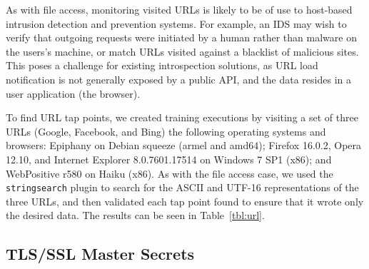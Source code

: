 As with file access, monitoring visited URLs is likely to be of use to
host-based intrusion detection and prevention systems. For example, an
IDS may wish to verify that outgoing requests were initiated by a human
rather than malware on the users's machine, or match URLs visited
against a blacklist of malicious sites. This poses a challenge for
existing introspection solutions, as URL load notification is not
generally exposed by a public API, and the data resides in a user
application (the browser).

To find URL tap points, we created training executions by visiting a set
of three URLs (Google, Facebook, and Bing) the following operating
systems and browsers: Epiphany on Debian squeeze (armel and amd64);
Firefox 16.0.2, Opera 12.10, and Internet Explorer 8.0.7601.17514 on
Windows 7 SP1 (x86); and WebPositive r580 on Haiku (x86). As with the
file access case, we used the \texttt{stringsearch} plugin to search for
the ASCII and UTF-16 representations of the three URLs, and then
validated each tap point found to ensure that it wrote only the desired
data. The results can be seen in Table~\ref{tbl:url}.

\subsection{TLS/SSL Master Secrets}
\label{sec:eval:subsec:ssl}

